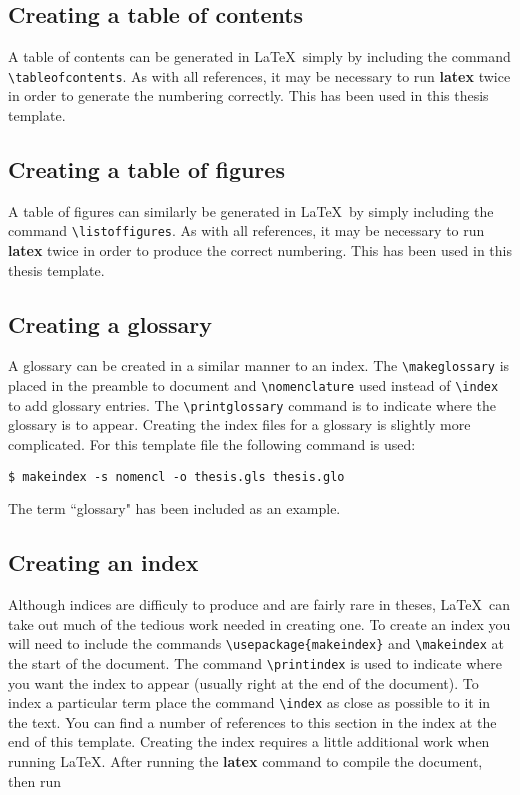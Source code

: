 \documentclass[11pt,oneside]{book}
\begin{document}
\subsection{Creating a table of contents}
A table of contents can be generated in \LaTeX \ simply by including
the command \verb+\tableofcontents+. As with all references, it may be
necessary to run {\bf latex} twice in order to generate the numbering
correctly. This has been used in this thesis template.

\subsection{Creating a table of figures}
A table of figures can similarly be generated in \LaTeX \ by simply including
the command \verb+\listoffigures+. As with all references, it may be
necessary to run {\bf latex} twice in order to produce the correct numbering.
This has been used in this thesis template.

\subsection{Creating a glossary}
A glossary can be created in a similar manner to an index. The
\verb+\makeglossary+ is placed in the preamble to document and
\verb+\nomenclature+ used instead of \verb+\index+ to add
glossary entries. The \verb+\printglossary+ command is to indicate
where the glossary is to appear. Creating the index files for a glossary
is slightly more complicated. For this template file the following command
is used:

\begin{verbatim}
$ makeindex -s nomencl -o thesis.gls thesis.glo
\end{verbatim}

The term ``glossary" has been included as an example.

\subsection{Creating an index}
Although indices   are difficuly to produce and are
fairly rare in theses, \LaTeX \ can take
out much of
the tedious work needed in creating one. To create
an index you will need to include the commands \verb+\usepackage{makeindex}+
and \verb+\makeindex+ at the start of the document. The command \verb+\printindex+
is used to indicate where you want the index to appear (usually right at the
end of the document). To index a particular term place the command \verb+\index+
as close as possible to it in the text. You can find a number of references to
this section in the index at the end of this template. Creating the index
requires a little additional work when running \LaTeX. After running the
{\bf latex} command to compile the document, then run
\end{document}
